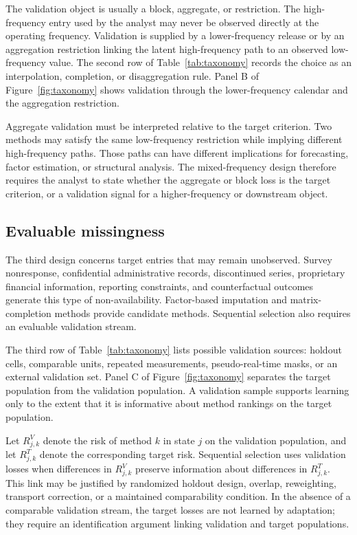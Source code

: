 \documentclass[a4paper, 12pt]{article}
\theoremstyle{plain}
\theoremstyle{remark}
\newcommand{\1}{\mathbf{1}}
\begin{document}
The validation object is usually a block, aggregate, or restriction. The high-frequency entry used by the analyst may never be observed directly at the operating frequency. Validation is supplied by a lower-frequency release or by an aggregation restriction linking the latent high-frequency path to an observed low-frequency value. The second row of Table~\ref{tab:taxonomy} records the choice as an interpolation, completion, or disaggregation rule. Panel B of Figure~\ref{fig:taxonomy} shows validation through the lower-frequency calendar and the aggregation restriction.

Aggregate validation must be interpreted relative to the target criterion. Two methods may satisfy the same low-frequency restriction while implying different high-frequency paths. Those paths can have different implications for forecasting, factor estimation, or structural analysis. The mixed-frequency design therefore requires the analyst to state whether the aggregate or block loss is the target criterion, or a validation signal for a higher-frequency or downstream object.

\subsection{Evaluable missingness}

The third design concerns target entries that may remain unobserved. Survey nonresponse, confidential administrative records, discontinued series, proprietary financial information, reporting constraints, and counterfactual outcomes generate this type of non-availability. Factor-based imputation and matrix-completion methods \citep{BaiNg2021,JinMiaoSu2021,CahanBaiNg2023,XiongPelger2023,DuanPelgerXiong2024,SuWang2025} provide candidate methods. Sequential selection also requires an evaluable validation stream.

The third row of Table~\ref{tab:taxonomy} lists possible validation sources: holdout cells, comparable units, repeated measurements, pseudo-real-time masks, or an external validation set. Panel C of Figure~\ref{fig:taxonomy} separates the target population from the validation population. A validation sample supports learning only to the extent that it is informative about method rankings on the target population.

Let \(R^V_{j,k}\) denote the risk of method \(k\) in state \(j\) on the validation population, and let \(R^T_{j,k}\) denote the corresponding target risk. Sequential selection uses validation losses when differences in \(R^V_{j,k}\) preserve information about differences in \(R^T_{j,k}\). This link may be justified by randomized holdout design, overlap, reweighting, transport correction, or a maintained comparability condition. In the absence of a comparable validation stream, the target losses are not learned by adaptation; they require an identification argument linking validation and target populations.
\end{document}
